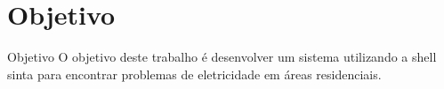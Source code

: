 \renewcommand{\titulo}{Objetivo}
\section{\titulo}


\begin{frame}{\titulo}
O objetivo deste trabalho é desenvolver um sistema utilizando a shell sinta para encontrar problemas de eletricidade em áreas residenciais.
\end{frame}

